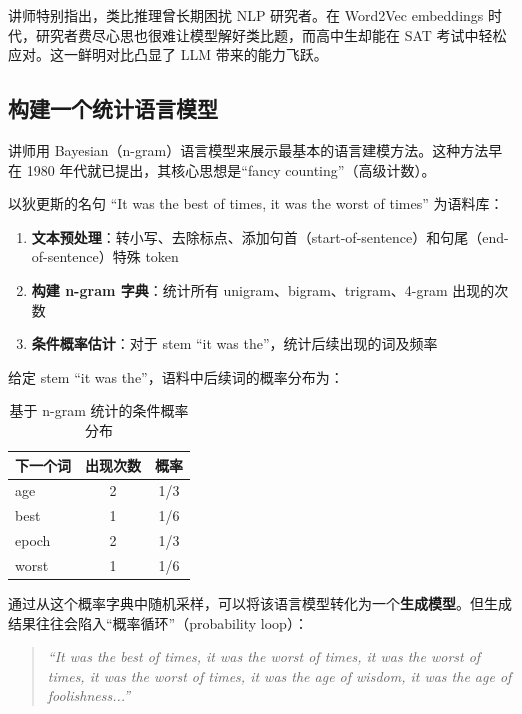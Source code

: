 讲师特别指出，类比推理曾长期困扰 NLP 研究者。在 Word2Vec embeddings 时代，研究者费尽心思也很难让模型解好类比题，而高中生却能在 SAT 考试中轻松应对。这一鲜明对比凸显了 LLM 带来的能力飞跃。

\subsection{构建一个统计语言模型}

讲师用 Bayesian（n-gram）语言模型来展示最基本的语言建模方法。这种方法早在 1980 年代就已提出，其核心思想是``fancy counting''（高级计数）。

以狄更斯的名句 ``It was the best of times, it was the worst of times'' 为语料库：

\begin{enumerate}
    \item \textbf{文本预处理}：转小写、去除标点、添加句首（start-of-sentence）和句尾（end-of-sentence）特殊 token
    \item \textbf{构建 n-gram 字典}：统计所有 unigram、bigram、trigram、4-gram 出现的次数
    \item \textbf{条件概率估计}：对于 stem ``it was the''，统计后续出现的词及频率
\end{enumerate}

给定 stem ``it was the''，语料中后续词的概率分布为：

\begin{table}[H]
\centering
\begin{tabular}{lcc}
\toprule
\textbf{下一个词} & \textbf{出现次数} & \textbf{概率} \\
\midrule
age       & 2 & 1/3 \\
best      & 1 & 1/6 \\
epoch     & 2 & 1/3 \\
worst     & 1 & 1/6 \\
\bottomrule
\end{tabular}
\caption{基于 n-gram 统计的条件概率分布}
\end{table}

通过从这个概率字典中随机采样，可以将该语言模型转化为一个\textbf{生成模型}。但生成结果往往会陷入``概率循环''（probability loop）：

\begin{quote}
\textit{``It was the best of times, it was the worst of times, it was the worst of times, it was the worst of times, it was the age of wisdom, it was the age of foolishness...''}
\end{quote}


